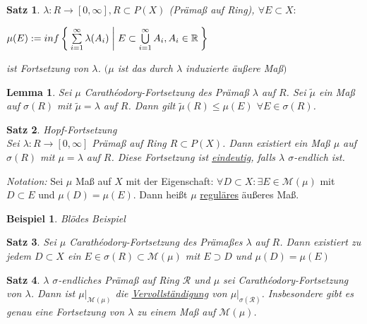 \documentclass[11pt]{memoir}
\theoremstyle{changebreak}
\newtheorem{Beispiel}{Beispiel}[chapter]
\newtheorem{Lemma}{Lemma}[chapter]
\newtheorem{Satz}{Satz}[chapter]
\newcommand{\cara}{Carathéodory-Fortsetzung}
\begin{document}
\begin{Satz}
$\lambda: R \rightarrow [0, \infty], {}R \subset P(X)$ (Prämaß auf Ring), $\forall {}E \subset X:$ \\
\begin{center}
$\mu(E):= inf\Set{ \sum\limits_{i=1}^{\infty} \lambda(A_i) | E \subset \bigcup\limits_{i=1}^{\infty} A_i, A_i \in \mathbb{R}}$
\end{center}
ist Fortsetzung von $\lambda$. $(\mu$ ist das durch $\lambda$ induzierte äußere Maß$)$
\end{Satz}

\begin{Lemma}
Sei $\mu$ \cara{} des Prämaß $\lambda$ auf $R$. Sei $\tilde{\mu}$ ein Maß auf $\sigma(R)$ mit $\tilde{\mu} = \lambda$ auf $R$. Dann gilt $\tilde{\mu}(R) \leq \mu(E)$ $\forall E \in \sigma(R)$.
\end{Lemma}

\begin{Satz} \emph{Hopf-Fortsetzung} \\
Sei $\lambda: R \rightarrow [0, \infty]$ Prämaß auf Ring $R \subset P(X)$. Dann existiert ein Maß $\mu$ auf $\sigma(R)$ mit $\mu =\lambda$ auf $R$. Diese Fortsetzung ist \underline{eindeutig}, falls $\lambda$ $\sigma$-endlich ist.
\end{Satz}

\emph{Notation:}
Sei $\mu$ Maß auf $X$ mit der Eigenschaft: $\forall D \subset X: \exists E \in \mathscr{M}(\mu)$ mit $D \subset E$ und $\mu(D) = \mu(E)$. Dann heißt $\mu$ \underline{reguläres} äußeres Maß.

\begin{Beispiel}
Blödes Beispiel
\end{Beispiel}

\begin{Satz}
Sei $\mu$ \cara{} des Prämaßes $\lambda$ auf $R$. Dann existiert zu jedem $D \subset X$ ein $E \in \sigma(R) \subset \mathscr M(\mu)$ mit $E \supset D$ und $\mu(D) = \mu(E)$
\end{Satz}

\begin{Satz}
$\lambda$  $\sigma$-endliches Prämaß auf Ring $\mathscr R$ und $\mu$ sei \cara{} von $\lambda$. Dann ist $\mu|_{\mathscr M(\mu)}$ die \underline{Vervollständigung} von $\mu|_{\sigma(\mathscr R)}$. Insbesondere gibt es genau eine Fortsetzung von $\lambda$ zu einem Maß auf $\mathscr M(\mu)$.
\end{Satz}
\end{document}
